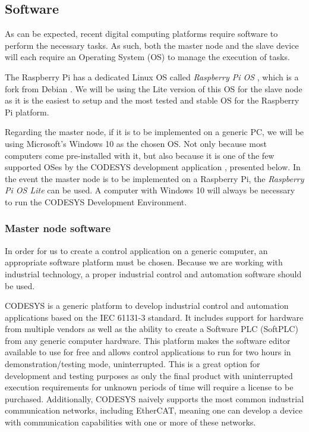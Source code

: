 \subsection{Software} \label{sec:proposed-software}

As can be expected, recent digital computing platforms require software to perform the necessary tasks.
As such, both the master node and the slave device will each require an Operating System (OS) to manage the execution of tasks.

The Raspberry Pi has a dedicated Linux OS called \emph{Raspberry Pi OS} \cite{os:raspberry-pi-os}, which is a fork from Debian \cite{os:debian}.
We will be using the Lite version of this OS for the slave node as it is the easiest to setup and the most tested and stable OS for the Raspberry Pi platform.

Regarding the master node, if it is to be implemented on a generic PC, we will be using Microsoft's Windows 10\texttrademark{} \cite{os:windows-10} as the chosen OS.
Not only because most computers come pre-installed with it, but also because it is one of the few supported OSes by the CODESYS development application \cite{ide:codesys}, presented below.
In the event the master node is to be implemented on a Raspberry Pi, the \emph{Raspberry Pi OS Lite} can be used.
A computer with Windows 10 will always be necessary to run the CODESYS Development Environment.

\subsubsection{Master node software}

In order for us to create a control application on a generic computer, an appropriate software platform must be chosen.
Because we are working with industrial technology, a proper industrial control and automation software should be used.

CODESYS is a generic platform to develop industrial control and automation applications based on the IEC 61131-3 standard.
It includes support for hardware from multiple vendors as well as the ability to create a Software PLC (SoftPLC) from any generic computer hardware.
This platform makes the software editor available to use for free and allows control applications to run for two hours in demonstration/testing mode, uninterrupted.
This is a great option for development and testing purposes as only the final product with uninterrupted execution requirements for unknown periods of time will require a license to be purchased.
Additionally, CODESYS naively supports the most common industrial communication networks, including EtherCAT, meaning one can develop a device with communication capabilities with one or more of these networks.

